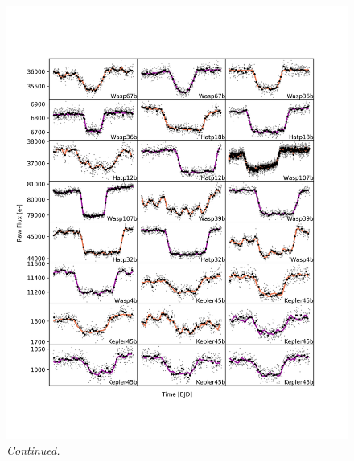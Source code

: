 \begin{subappendices}
  \addtocounter{figure}{-1}
  \begin{figure}
      \label{P1:fig:rawlc2}
    \includegraphics[width=\textwidth]{RawLighctuves2.pdf}
    \caption{\textit{Continued.}}
  \end{figure}



\end{subappendices}
